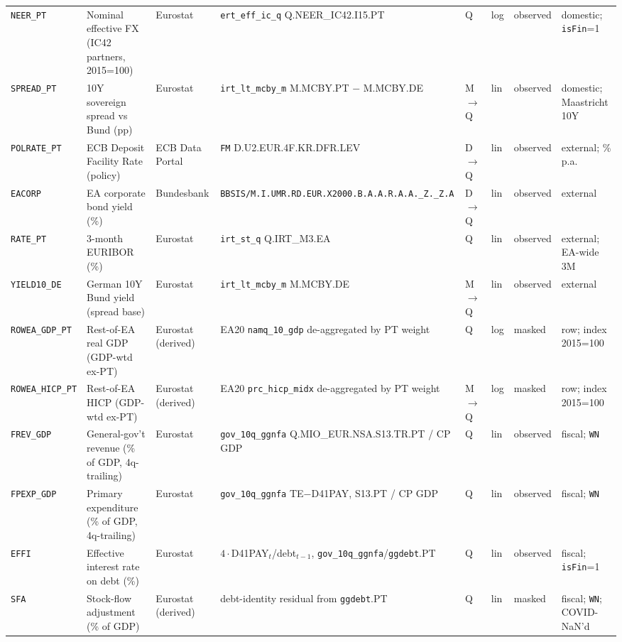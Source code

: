 \begin{longtable}{@{}p{}p{}p{}p{}p{}p{}p{}p{}@{}}
\texttt{NEER\_PT}  & Nominal effective FX (IC42 partners, 2015=100) & Eurostat & \texttt{ert\_eff\_ic\_q} Q.NEER\_IC42.I15.PT & Q & log & observed & domestic; \texttt{isFin}=1 \\
\texttt{SPREAD\_PT}& 10Y sovereign spread vs Bund (pp) & Eurostat & \texttt{irt\_lt\_mcby\_m} M.MCBY.PT $-$ M.MCBY.DE & M$\to$Q & lin & observed & domestic; Maastricht 10Y \\
\texttt{POLRATE\_PT}& ECB Deposit Facility Rate (policy) & ECB Data Portal & \texttt{FM} D.\allowbreak U2.\allowbreak EUR.\allowbreak 4F.\allowbreak KR.\allowbreak DFR.\allowbreak LEV & D$\to$Q & lin & observed & external; \% p.a. \\
\texttt{EACORP}    & EA corporate bond yield (\%) & Bundesbank & \texttt{BBSIS/\allowbreak M.\allowbreak I.\allowbreak UMR.\allowbreak RD.\allowbreak EUR.\allowbreak X2000.\allowbreak B.A.A.\allowbreak R.A.A.\allowbreak \_Z.\_Z.A} & D$\to$Q & lin & observed & external \\
\texttt{RATE\_PT}  & 3-month EURIBOR (\%) & Eurostat & \texttt{irt\_st\_q} Q.IRT\_M3.EA & Q & lin & observed & external; EA-wide 3M \\
\texttt{YIELD10\_DE}& German 10Y Bund yield (spread base) & Eurostat & \texttt{irt\_lt\_mcby\_m} M.MCBY.DE & M$\to$Q & lin & observed & external \\
\texttt{ROWEA\_GDP\_PT}  & Rest-of-EA real GDP (GDP-wtd ex-PT) & Eurostat (derived) & EA20 \texttt{namq\_10\_gdp} de-aggregated by PT weight & Q & log & masked & row; index 2015=100 \\
\texttt{ROWEA\_HICP\_PT} & Rest-of-EA HICP (GDP-wtd ex-PT) & Eurostat (derived) & EA20 \texttt{prc\_hicp\_midx} de-aggregated by PT weight & M$\to$Q & log & masked & row; index 2015=100 \\
\texttt{FREV\_GDP} & General-gov't revenue (\% of GDP, 4q-trailing) & Eurostat & \texttt{gov\_10q\_ggnfa} Q.\allowbreak MIO\_EUR.\allowbreak NSA.\allowbreak S13.\allowbreak TR.\allowbreak PT / CP GDP & Q & lin & observed & fiscal; \texttt{WN} \\
\texttt{FPEXP\_GDP}& Primary expenditure (\% of GDP, 4q-trailing) & Eurostat & \texttt{gov\_10q\_ggnfa} TE$-$D41PAY, S13.PT / CP GDP & Q & lin & observed & fiscal; \texttt{WN} \\
\texttt{EFFI}      & Effective interest rate on debt (\%) & Eurostat & $4\cdot$D41PAY$_t$/debt$_{t-1}$, \texttt{gov\_10q\_ggnfa}/\texttt{ggdebt}.PT & Q & lin & observed & fiscal; \texttt{isFin}=1 \\
\texttt{SFA}       & Stock-flow adjustment (\% of GDP) & Eurostat (derived) & debt-identity residual from \texttt{ggdebt}.PT & Q & lin & masked & fiscal; \texttt{WN}; COVID-NaN'd \\

\end{longtable}
